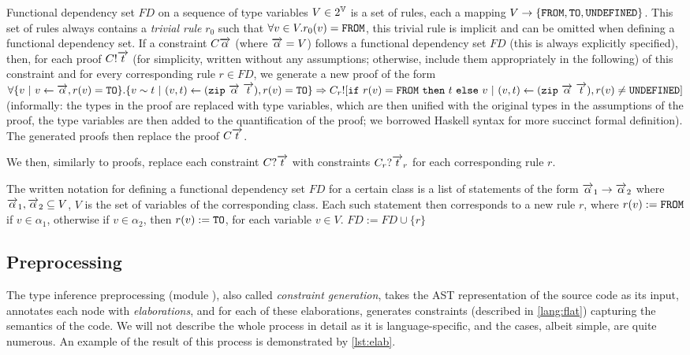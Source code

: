 \begin{description}
    Functional dependency set $FD$ on a sequence of type variables $V \in 2^{\mathbb{V}}$ is a set of rules, each a mapping $V \to \{\mathtt{FROM}, \mathtt{TO}, \mathtt{UNDEFINED}\}$. This set of rules always contains a \emph{trivial rule} $r_0$ such that $\forall v \in V . r_0(v) = \mathtt{FROM}$, this trivial rule is implicit and can be omitted when defining a functional dependency set. If a constraint $C \overrightarrow{\alpha}$ (where $\overrightarrow{\alpha} = V$) follows a functional dependency set $FD$ (this is always explicitly specified), then, for each proof $C! \overrightarrow{t}$ (for simplicity, written without any assumptions; otherwise, include them appropriately in the following) of this constraint and for every corresponding rule $r \in FD$, we generate a new proof of the form $\forall \{v \ |\  v \gets \overrightarrow{\alpha}, r(v) = \mathtt{TO}\} . \{v \sim t \ |\  (v, t) \gets (\mathtt{zip}\ \overrightarrow{\alpha}\ \overrightarrow{t}), r(v) = \mathtt{TO} \} \Rightarrow C_r! [\mathtt{if}\ r(v) = \mathtt{FROM}\ \mathtt{then}\ t\ \mathtt{else}\ v \ |\  (v, t) \gets (\mathtt{zip}\ \overrightarrow{\alpha}\ \overrightarrow{t}), r(v) \neq \mathtt{UNDEFINED}]$ (informally: the  types in the proof are replaced with type variables, which are then unified with the original types in the assumptions of the proof, the type variables are then added to the quantification of the proof; we borrowed Haskell syntax for more succinct formal definition). The generated proofs then replace the proof $C \overrightarrow{t}$.

    We then, similarly to proofs, replace each constraint $C? \overrightarrow{t}$ with constraints $C_r? \overrightarrow{t}_r$ for each corresponding rule $r$.

    The written notation for defining a functional dependency set $FD$ for a certain class is a list of statements of the form $\overrightarrow{\alpha}_1 \to \overrightarrow{\alpha}_2$ where $\overrightarrow{\alpha}_1, \overrightarrow{\alpha}_2 \subseteq V$, $V$ is the set of variables of the corresponding class. Each such statement then corresponds to a new rule $r$, where $r(v) := \mathtt{FROM}$ if $v \in \alpha_1$, otherwise if $v \in \alpha_2$, then $r(v) := \mathtt{TO}$, for each variable $v \in V$. $FD := FD \cup \{r\}$
\end{description}

\subsection{Preprocessing}
\label{preprocessing}

The type inference preprocessing (module ), also called \emph{constraint generation}, takes the AST representation of the source code as its input, annotates each node with \emph{elaborations}, and for each of these elaborations, generates constraints (described in \cref{lang:flat}) capturing the semantics of the code. We will not describe the whole process in detail as it is language-specific, and the cases, albeit simple, are quite numerous. An example of the result of this process is demonstrated by \cref{lst:elab}.


